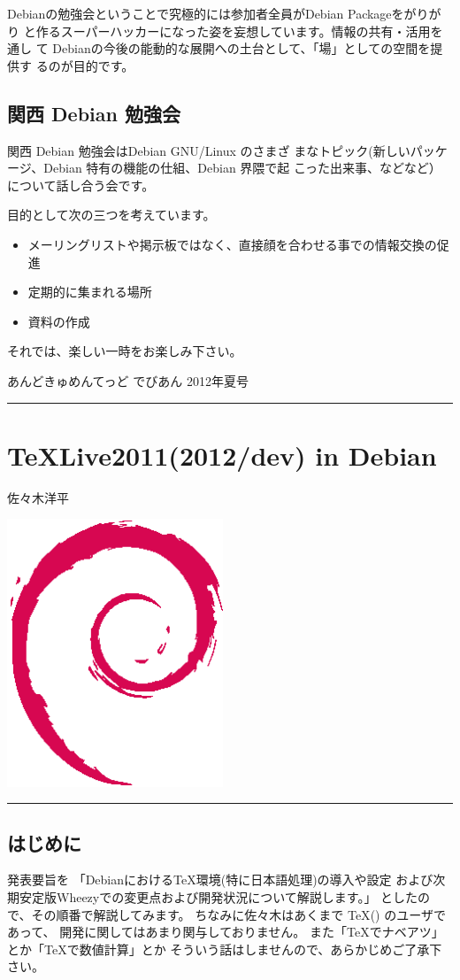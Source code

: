 \documentclass[mingoth,a4paper]{jsarticle}
\renewcommand{\dancersection}[2]{%
\newpage
あんどきゅめんてっど でびあん 2012年夏号
%
\vspace{0.1mm}\\
{\color{dancerdarkblue}\rule{\hsize}{2mm}}

%
%
\begin{minipage}[t]{0.6\hsize}
\color{dancerdarkblue}
\vspace{1cm}
\section{#1}
\hfill{}#2\\
\end{minipage}
\begin{minipage}[t]{0.4\hsize}
\vspace{-2cm}
\hfill{}\includegraphics[height=8cm]{image200502/openlogo-nd.eps}\\
\vspace{-5cm}
\end{minipage}
%
{\color{dancerlightblue}\rule{0.66\hsize}{2mm}}
%
\vspace{2cm}
}
\begin{document}
 Debianの勉強会ということで究極的には参加者全員がDebian Packageをがりがり
 と作るスーパーハッカーになった姿を妄想しています。情報の共有・活用を通し
 て Debianの今後の能動的な展開への土台として、「場」としての空間を提供す
 るのが目的です。

\subsection{関西 Debian 勉強会}

 関西 Debian 勉強会はDebian GNU/Linux のさまざ
 まなトピック(新しいパッケージ、Debian 特有の機能の仕組、Debian 界隈で起
 こった出来事、などなど）について話し合う会です。

 目的として次の三つを考えています。
 \begin{itemize}
  \item メーリングリストや掲示板ではなく、直接顔を合わせる事での情報交換の促進
  \item 定期的に集まれる場所
  \item 資料の作成
 \end{itemize}

 それでは、楽しい一時をお楽しみ下さい。


\clearpage
\newpage


\dancersection{TeXLive2011(2012/dev) in Debian}{佐々木洋平}
\label{sec:TeXLive2011}

\subsection{はじめに}

発表要旨を
「Debianにおける{\TeX}環境(特に日本語処理)の導入や設定
および次期安定版Wheezyでの変更点および開発状況について解説します。」
としたので、その順番で解説してみます。
%
ちなみに佐々木はあくまで {\TeX}({\pLaTeX}) のユーザであって、
開発に関してはあまり関与しておりません。
%
また「{\TeX}でナベアツ」とか「{\TeX}で数値計算」とか
そういう話はしませんので、あらかじめご了承下さい。
\end{document}
